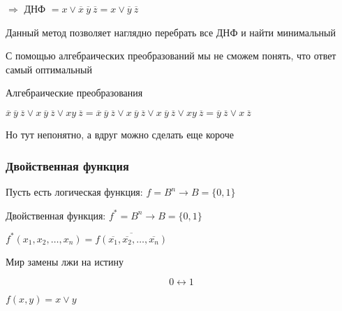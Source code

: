 \documentclass[russian]{lecture-notes}
\begin{document}
\begin{sloppypar}
\begin{example}

            $\Rightarrow $ ДНФ $ = x \lor \overline{x} \: \overline{y} \: \overline{z} = x \lor \overline{y} \: \overline{z}$

        \end{example}

        \begin{remark}
            Данный метод позволяет наглядно перебрать все ДНФ и найти минимальный

            С помощью алгебраических преобразований мы не сможем понять, что ответ самый оптимальный
        \end{remark}

        \begin{example}
            Алгебраические преобразования

            $\overline{x} \: \overline{y} \: \overline{z} \lor x \: \overline{y} \: \overline{z} \lor xy \: \overline{z} = \overline{x} \: \overline{y} \: \overline{z} \lor x \: \overline{y} \: \overline{z} \lor x \: \overline{y} \: \overline{z} \lor xy \: \overline{z} = \overline{y} \: \overline{z} \lor x \: \overline{z}$

            Но тут непонятно, а вдруг можно сделать еще короче
        \end{example}

        \subsubsection{Двойственная функция}

        Пусть есть логическая функция: $f = B^n \rightarrow B = \{0, 1\}$

        Двойственная функция: $f^* = B^n \rightarrow B = \{0, 1\}$

        $f^*(x_1, x_2, \dots, x_n) = \overline{f(\overline{x_1}, \overline{x_2}, \dots, \overline{x_n})}$

        \begin{remark}
            Мир замены лжи на истину

            $$0 \leftrightarrow 1$$
        \end{remark}

        \begin{example}
            $f(x, y) = x \lor y$


\end{example}
\end{sloppypar}
\end{document}

